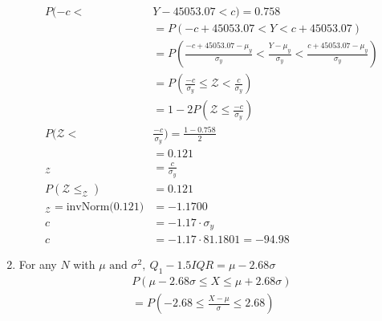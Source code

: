 \documentclass{article}
\begin{document}
\begin{enumerate}[label=\alph*)]
          \begin{align*}
              P(-c <                                 & Y-45053.07 < c)              = 0.758                                                                   \\
                                                     & = P(-c + 45053.07 < Y < c + 45053.07)                                                                  \\
                                                     & = P(\frac{-c+45053.07-\mu_y}{\sigma_y} < \frac{Y-\mu_y}{\sigma_y} < \frac{c+45053.07-\mu_y}{\sigma_y}) \\
                                                     & = P(\frac{-c}{\sigma_y} \leq \mathcal{Z} < \frac{c}{\sigma_y})                                         \\
                                                     & = 1 - 2P(\mathcal{Z} \leq \frac{-c}{\sigma_y})                                                         \\
              P(\mathcal{Z}<                         & \frac{-c}{\sigma_y})      = \frac{1-0.758}{2}                                                          \\
                                                     & =                                  0.121                                                               \\
              _{\mathcal{Z}}                         & = \frac{c}{\sigma_y}                                                                                   \\
              P(\mathcal{Z\leq_{\mathcal{Z}}})       & = 0.121                                                                                                \\
              _{\mathcal{Z}} = \text{invNorm(0.121)} & = -1.1700                                                                                              \\
              c                                      & = -1.17 \cdot \sigma_y                                                                                 \\
              c                                      & = -1.17 \cdot 81.1801 = -94.98
          \end{align*}
    \item For any \(N\) with \(\mu \text{ and } \sigma^2,\ Q_1 - 1.5IQR = \mu - 2.68 \sigma\)
          \begin{align*}
              P(\mu - 2.68 \sigma \leq X \leq \mu + 2.68 \sigma) \\
              = P(-2.68 \leq \frac{X-\mu}{\sigma} \leq 2.68)     \\
          \end{align*}
\end{enumerate}
\end{document}
